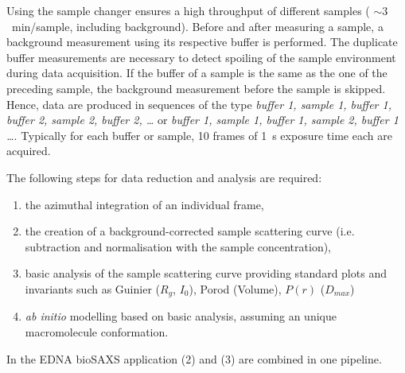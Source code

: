\documentclass[preprint,pdf]{iucr}              %
\begin{document}
Using the sample changer ensures a high throughput of different samples (
$\sim 3$~min/sample, including background).
Before and after measuring a sample, a background measurement using its
respective buffer is performed. The duplicate buffer measurements are necessary to detect 
spoiling of the sample environment during data acquisition.
If the buffer of a sample is the same as the one of the preceding sample, the
background measurement before the sample is skipped.
Hence, data are produced in sequences of the type \textit{buffer 1, sample 1,
buffer 1, buffer 2, sample 2, buffer 2, \ldots}  or  \textit{buffer 1, sample 1,
buffer 1,  sample 2, buffer 1 \ldots}.
Typically for each buffer or sample, 10 frames of 1~s exposure time each are
acquired.

The following steps for data reduction and analysis are required:
\begin{enumerate}
\item the azimuthal integration of an individual frame,
\item the creation of a background-corrected sample scattering curve (i.e. subtraction 
and normalisation with the sample concentration),
\item  basic analysis of the sample scattering curve providing standard plots and invariants such as Guinier ($R_g$, $I_0$), Porod (Volume), $P(r)$ ($D_{max}$)
\item \textit{ab initio} modelling based on basic analysis, assuming an unique
macromolecule conformation.
\end{enumerate}
In the EDNA bioSAXS application (2) and (3) are combined in one pipeline.
\end{document}
